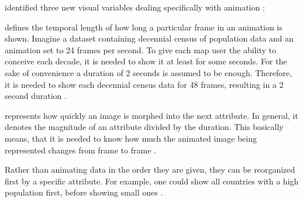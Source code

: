 \citeauthor{DiBiase1992} identified three new visual variables dealing specifically with animation :

\begin{enumerate}

 defines the temporal length of how long a particular frame in an animation is shown. Imagine a dataset containing decennial census of population data and an animation set to 24 frames per second. To give each map user the ability to conceive each decade, it is needed to show it at least for some seconds. For the sake of convenience a duration of 2 seconds is assumed to be enough. Therefore, it is needed to show each decennial census data for 48 frames, resulting in a 2 second duration .

 represents how quickly an image is morphed into the next attribute. In general, it denotes the magnitude of an attribute divided by the duration. This basically means, that it is needed to know how much the animated image being represented changes from frame to frame .

Rather than animating data in the order they are given, they can be reorganized first by a specific attribute. For example, one could show all countries with a high population first, before showing small ones .

\end{enumerate}


